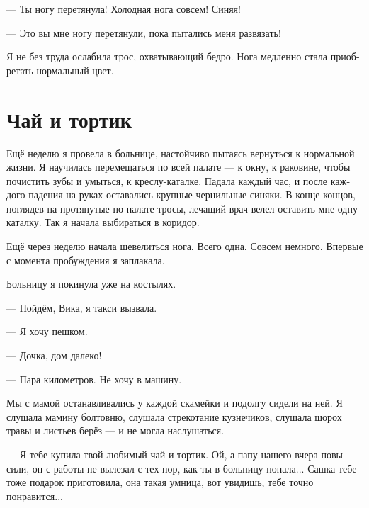 \documentclass[a4paper,10pt,fleqn]{book}\usepackage{polyglossia}\setdefaultlanguage[babelshorthands=true]{russian}\setotherlanguage{english}\defaultfontfeatures{Ligatures=TeX,Mapping=tex-text}\usepackage{xcolor}\newcommand{\ml}[3]{#2}
\begin{document}
--- Ты ногу перетянула!
Холодная нога совсем!
Синяя!

--- Это вы мне ногу перетянули, пока пытались меня развязать!

Я не без труда ослабила трос, охватывающий бедро.
Нога медленно стала приобретать нормальный цвет.

\section{Чай и тортик}

Ещё неделю я провела в больнице, настойчиво пытаясь вернуться к нормальной жизни.
Я научилась перемещаться по всей палате --- к окну, к раковине, чтобы почистить зубы и умыться, к креслу-каталке.
Падала каждый час, и после каждого падения на руках оставались крупные чернильные синяки.
В конце концов, поглядев на протянутые по палате тросы, лечащий врач велел оставить мне одну каталку.
Так я начала выбираться в коридор.

Ещё через неделю начала шевелиться нога.
Всего одна.
Совсем немного.
Впервые с момента пробуждения я заплакала.

Больницу я покинула уже на костылях.

--- Пойдём, Вика, я такси вызвала.

--- Я хочу пешком.

--- Дочка, дом далеко!

--- Пара километров.
Не хочу в машину.

Мы с мамой останавливались у каждой скамейки и подолгу сидели на ней.
Я слушала мамину болтовню, слушала стрекотание кузнечиков, слушала шорох травы и листьев берёз --- и не могла наслушаться.

--- Я тебе купила твой любимый чай и тортик.
Ой, а папу нашего вчера повысили, он с работы не вылезал с тех пор, как ты в больницу попала...
Сашка тебе тоже подарок приготовила, она такая умница, вот увидишь, тебе точно понравится...
\end{document}
